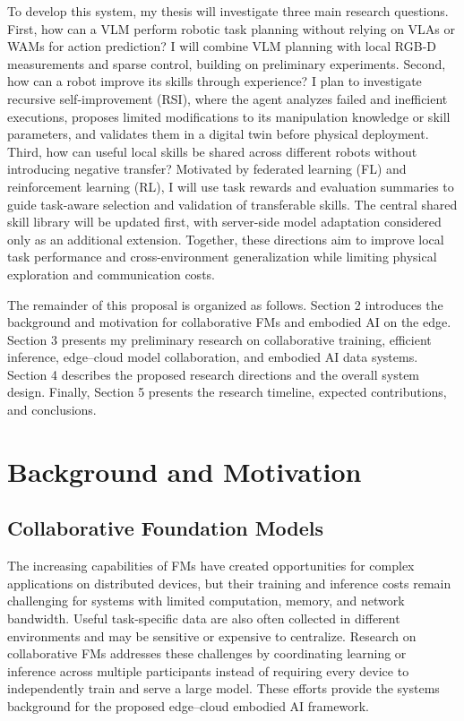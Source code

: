 \documentclass[11pt]{article}
\begin{document}
To develop this system, my thesis will investigate three main research questions. First, how can a VLM perform robotic task planning without relying on VLAs or WAMs for action prediction? I will combine VLM planning with local RGB-D measurements and sparse control, building on preliminary experiments. Second, how can a robot improve its skills through experience? I plan to investigate recursive self-improvement (RSI), where the agent analyzes failed and inefficient executions, proposes limited modifications to its manipulation knowledge or skill parameters, and validates them in a digital twin before physical deployment. Third, how can useful local skills be shared across different robots without introducing negative transfer? Motivated by federated learning (FL) and reinforcement learning (RL), I will use task rewards and evaluation summaries to guide task-aware selection and validation of transferable skills. The central shared skill library will be updated first, with server-side model adaptation considered only as an additional extension. Together, these directions aim to improve local task performance and cross-environment generalization while limiting physical exploration and communication costs.

The remainder of this proposal is organized as follows. Section 2 introduces the background and motivation for collaborative FMs and embodied AI on the edge. Section 3 presents my preliminary research on collaborative training, efficient inference, edge--cloud model collaboration, and embodied AI data systems. Section 4 describes the proposed research directions and the overall system design. Finally, Section 5 presents the research timeline, expected contributions, and conclusions.

\section{Background and Motivation}
\label{sec:background}

\subsection{Collaborative Foundation Models}
\label{subsec:collaborative_fm}

The increasing capabilities of FMs have created opportunities for complex applications on distributed devices, but their training and inference costs remain challenging for systems with limited computation, memory, and network bandwidth. Useful task-specific data are also often collected in different environments and may be sensitive or expensive to centralize. Research on collaborative FMs addresses these challenges by coordinating learning or inference across multiple participants instead of requiring every device to independently train and serve a large model. These efforts provide the systems background for the proposed edge--cloud embodied AI framework.
\end{document}
